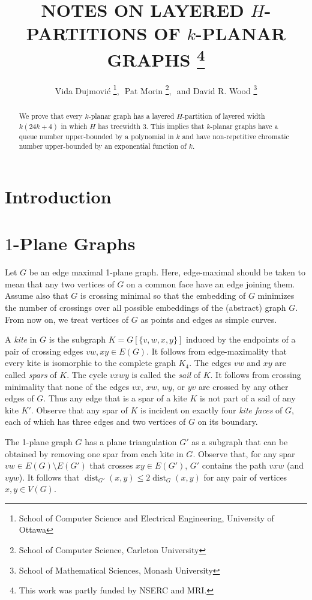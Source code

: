 \documentclass{patmorin}
\title{\MakeUppercase{Notes on Layered $H$-Partitions of $k$-Planar Graphs}%
    \thanks{This work was partly funded by NSERC and MRI.}}
\author{Vida Dujmovi\'c%
        \thanks{School of Computer Science and Electrical Engineering, 
                University of Ottawa},\,\, 
        Pat Morin%
        \thanks{School of Computer Science, Carleton University},\,\, and
        David R. Wood%
        \thanks{School of Mathematical Sciences, Monash University}}
\DeclareMathOperator{\dist}{dist}
\begin{document}
\maketitle


\begin{abstract}
  We prove that every $k$-planar graph has a layered $H$-partition of layered width $k(24k+4)$ in which $H$ has treewidth 3. This implies that $k$-planar graphs have a queue number upper-bounded by a polynomial in $k$ and have non-repetitive chromatic number upper-bounded by an exponential function of $k$.
\end{abstract}

\section{Introduction}

\section{$1$-Plane Graphs}

Let $G$ be an edge maximal 1-plane graph.  Here, edge-maximal should be taken to mean that any two vertices of $G$ on a common face have an edge joining them.  Assume also that $G$ is crossing minimal so that the embedding of $G$ minimizes the number of crossings over all possible embeddings of the (abstract) graph $G$.  From now on, we treat vertices of $G$ as points and edges as simple curves.

A \emph{kite} in $G$ is the subgraph $K=G[\{v,w,x,y\}]$ induced by the endpoints of a pair of crossing edges $vw,xy\in E(G)$.  It follows from edge-maximality that every kite is isomorphic to the complete graph $K_4$.
The edges $vw$ and $xy$ are called \emph{spars} of $K$.  The cycle $vxwy$ is called the \emph{sail} of $K$.  It follows from crossing minimality that none of the edges $vx$, $xw$, $wy$, or $yv$ are crossed by any other edges of $G$. Thus any edge that is a spar of a kite $K$ is not part of a sail of any kite $K'$. Observe that any spar of $K$ is incident on exactly four \emph{kite faces} of $G$, each of which has three edges and two vertices of $G$ on its boundary.

The 1-plane graph $G$ has a plane triangulation $G'$ as a subgraph that can be obtained by removing one spar from each kite in $G$.  Observe that, for any spar $vw\in E(G)\setminus E(G')$ that crosses $xy\in E(G')$, $G'$ contains the path $vxw$ (and $vyw$).  It follows that $\dist_{G'}(x,y)\le 2\dist_G(x,y)$ for any pair of vertices $x,y\in V(G)$.
\end{document}
